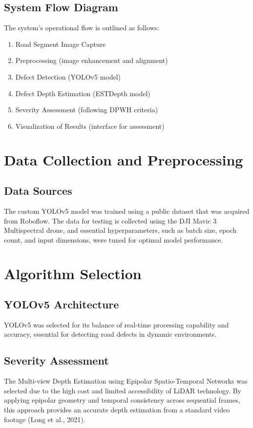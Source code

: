 \documentclass{report} %
\begin{document}
		\subsection{System Flow Diagram}
		The system’s operational flow is outlined as follows:
		\begin{enumerate}
			\item Road Segment Image Capture
			\item Preprocessing (image enhancement and alignment)
			\item Defect Detection (YOLOv5 model)
			\item Defect Depth Estimation (ESTDepth model)
			\item Severity Assessment (following DPWH criteria)
			\item Visualization of Results (interface for assessment)
		\end{enumerate}
		
		\section{Data Collection and Preprocessing}
		\subsection{Data Sources}
		The custom YOLOv5 model was trained using a public dataset that was acquired from Roboflow. The data for testing is collected using the DJI Mavic 3 Multispectral drone, and essential hyperparameters, such as batch size, epoch count, and input dimensions, were tuned for optimal model performance.
		
		\section{Algorithm Selection}
		\subsection{YOLOv5 Architecture}
		YOLOv5 was selected for its balance of real-time processing capability and accuracy, essential for detecting road defects in dynamic environments.
		\subsection{Severity Assessment}
		The Multi-view Depth Estimation using Epipolar Spatio-Temporal Networks was selected due to the high cost and limited accessibility of LiDAR technology. By applying epipolar geometry and temporal consistency across sequential frames, this approach provides an accurate depth estimation from a standard video footage (Long et al., 2021). 
		
\end{document}
